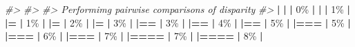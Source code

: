 \documentclass[
]{book}
\newenvironment{Shaded}{\begin{snugshade}}{\end{snugshade}}
\newcommand{\CommentTok}[1]{\textcolor[rgb]{0.56,0.35,0.01}{\textit{#1}}}
\newcommand{\DecValTok}[1]{\textcolor[rgb]{0.00,0.00,0.81}{#1}}
\newcommand{\ErrorTok}[1]{\textcolor[rgb]{0.64,0.00,0.00}{\textbf{#1}}}
\newcommand{\NormalTok}[1]{#1}
\newcommand{\SpecialCharTok}[1]{\textcolor[rgb]{0.81,0.36,0.00}{\textbf{#1}}}
\begin{document}
\begin{Shaded}
\begin{Highlighting}[]
\CommentTok{\#\textgreater{} }
\CommentTok{\#\textgreater{} }
\CommentTok{\#\textgreater{} Performimg pairwise comparisons of disparity}
\CommentTok{\#\textgreater{} }
  \SpecialCharTok{|}                                                        
  \ErrorTok{|}                                                  \ErrorTok{|}   \DecValTok{0}\NormalTok{\%}
  \SpecialCharTok{|}                                                        
  \ErrorTok{|}                                                  \ErrorTok{|}   \DecValTok{1}\NormalTok{\%}
  \SpecialCharTok{|}                                                        
  \ErrorTok{|=}                                                 \ErrorTok{|}   \DecValTok{1}\NormalTok{\%}
  \SpecialCharTok{|}                                                        
  \ErrorTok{|=}                                                 \ErrorTok{|}   \DecValTok{2}\NormalTok{\%}
  \SpecialCharTok{|}                                                        
  \ErrorTok{|=}                                                 \ErrorTok{|}   \DecValTok{3}\NormalTok{\%}
  \SpecialCharTok{|}                                                        
  \ErrorTok{|==}                                                \ErrorTok{|}   \DecValTok{3}\NormalTok{\%}
  \SpecialCharTok{|}                                                        
  \ErrorTok{|==}                                                \ErrorTok{|}   \DecValTok{4}\NormalTok{\%}
  \SpecialCharTok{|}                                                        
  \ErrorTok{|==}                                                \ErrorTok{|}   \DecValTok{5}\NormalTok{\%}
  \SpecialCharTok{|}                                                        
  \ErrorTok{|===}                                               \ErrorTok{|}   \DecValTok{5}\NormalTok{\%}
  \SpecialCharTok{|}                                                        
  \ErrorTok{|===}                                               \ErrorTok{|}   \DecValTok{6}\NormalTok{\%}
  \SpecialCharTok{|}                                                        
  \ErrorTok{|===}                                               \ErrorTok{|}   \DecValTok{7}\NormalTok{\%}
  \SpecialCharTok{|}                                                        
  \ErrorTok{|====}                                              \ErrorTok{|}   \DecValTok{7}\NormalTok{\%}
  \SpecialCharTok{|}                                                        
  \ErrorTok{|====}                                              \ErrorTok{|}   \DecValTok{8}\NormalTok{\%}
  \SpecialCharTok{|}                                                        

\end{Highlighting}
\end{Shaded}
\end{document}
